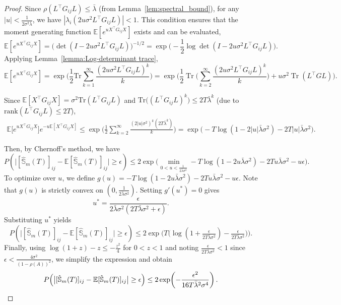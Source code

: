 \documentclass[10pt,a4paper]{amsart}
\DeclareMathOperator{\Tr}{Tr}
\begin{document}
\begin{proof}
\noindent
Since $\rho(L^\top G_{ij}L)\le\bar{\lambda}$ (from Lemma~\ref{lem:spectral_bound}), for any $|u|<\tfrac{1}{2\sigma^2\bar{\lambda}}$, we have $|\lambda_i(2u\sigma^2L^\top G_{ij}L)|<1.$
This condition ensures that the moment generating function
$\mathbb{E}[e^{uX^\top G_{ij}X}]$ exists and can be evaluated, 
\[
\mathbb{E}[e^{uX^\top G_{ij} X}]
= \big(\det(I-2u\sigma^2L^\top G_{ij}L)\big)^{-1/2}
= \exp\!\Big(-\frac{1}{2}\log\det(I-2u\sigma^2L^\top G_{ij}L)\Big).
\]
Applying Lemma~\ref{lemma:Log-determinant trace},
\[
\mathbb{E}[e^{uX^\top G_{ij} X}]
= \exp\!\Big(\frac{1}{2}\mathrm{Tr}\!\sum_{k=1}^\infty
\frac{(2u\sigma^2L^\top G_{ij}L)^k}{k}\Big)=\exp\Big(\frac{1}{2} \Tr\Big(\sum_{k=2}^{\infty} \frac{(2u\sigma^2L^\top G_{ij}L)^k}{k}\Big) + u \sigma^2 \Tr(L^\top GL) \Big) .
\]



Since
$\mathbb{E}[X^\top G_{ij}X]=\sigma^2\mathrm{Tr}(L^\top G_{ij}L)$
and $\mathrm{Tr}\big((L^\top G_{ij}L)^k\big)\le 2T\bar{\lambda}^k$ (due to $\mathrm{rank}(L^\top G_{ij}L)\le 2T$),
\begin{align*}
\mathbb{E}\big[e^{uX^\top G_{ij} X}\big]e^{-u\mathbb{E}[X^\top G_{ij} X]} 
\le \exp\!\Big(\frac{1}{2}\sum_{k=2}^\infty
\frac{(2|u|\sigma^2)^k(2T\bar{\lambda}^k)}{k}\Big)
= \exp\!\Big(-T\log(1-2|u|\bar{\lambda}\sigma^2)-2T|u|\bar{\lambda}\sigma^2\Big).
\end{align*}

Then, by Chernoff's method, we have
\[
P\!\left(\big|[\hat{\mathbb{S}}_m(T)]_{ij}-\mathbb{E}[\hat{\mathbb{S}}_m(T)]_{ij}\big|\ge\epsilon\right)
\le
2\exp\Big( \min_{0<u<\frac{1}{2\bar{\lambda}\sigma^2}}  -T \log(1-2u\bar{\lambda}\sigma^2) - 2Tu\bar{\lambda}\sigma^2  - u\epsilon \Big).
\]
To optimize over $u$, we define
$g(u)=-T\log(1-2u\bar{\lambda}\sigma^2)-2Tu\bar{\lambda}\sigma^2-u\epsilon$. Note that $g(u)$ is strictly convex on $(0,\tfrac{1}{2\bar{\lambda}\sigma^2})$.
Setting $g'(u^*)=0$ gives
\[
u^*=\frac{\epsilon}{2\bar{\lambda}\sigma^2(2T\bar{\lambda}\sigma^2+\epsilon)}.
\]
Substituting $u^*$ yields
\[
P\!\left(\big|[\hat{\mathbb{S}}_m(T)]_{ij}-\mathbb{E}[\hat{\mathbb{S}}_m(T)]_{ij}\big|\ge\epsilon\right)
\le
2\exp\!\Big(
T\big(\log(1+\tfrac{\epsilon}{2T\bar{\lambda}\sigma^2})
-\tfrac{\epsilon}{2T\bar{\lambda}\sigma^2}\big)
\Big).
\]
Finally, using $\log(1+z)-z\le -\tfrac{z^2}{4}$ for $0<z<1$
and noting $\tfrac{\epsilon}{2T\bar{\lambda}\sigma^2}<1$
since $\epsilon<\tfrac{4\sigma^2}{(1-\rho(A))^2}$,
we simplify the expression and obtain
\[
P\!\left(\big|[\hat{\mathbb{S}}_m(T)]_{ij}-\mathbb{E}[\hat{\mathbb{S}}_m(T)]_{ij}\big|\ge\epsilon\right)
\le
2\exp\!\left(-\frac{\epsilon^2}{16T\bar{\lambda}^2\sigma^4}\right).
\qedhere
\]
\end{proof}
\end{document}
